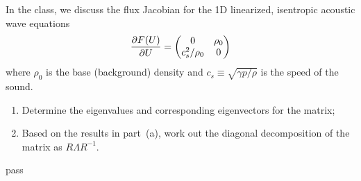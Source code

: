 \begin{homework}[label={H:2-4}]
    In the class, we discuss the flux Jacobian for the 1D linearized, isentropic acoustic wave equations
    \begin{equation}\label{E:2-4-1}
        \pdv{F(U)}{U} = \mqty(0 & \rho_0 \\ c^2_s/\rho_0 & 0)
    \end{equation}
    where $\rho_0$ is the base (background) density and $c_s\equiv\sqrt{\gamma p/\rho}$ is the speed of the sound.

    \begin{enumerate}[label=(\alph*)]
        \item Determine the eigenvalues and corresponding eigenvectors for the matrix;
        \item Based on the results in part~(a), work out the diagonal decomposition of the matrix as $R\Lambda R^{-1}$.
    \end{enumerate}
\end{homework}

pass
